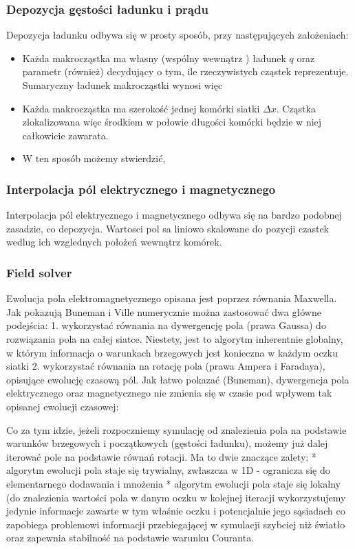 \subsubsection{Depozycja gęstości ładunku i prądu}
Depozycja ładunku odbywa się w prosty sposób, przy następujących założeniach:
\begin{itemize}
    \item Każda makrocząstka ma własny (wspólny wewnątrz ) ładunek $q$ oraz parametr  (również) %
    decydujący o tym, ile rzeczywistych cząstek reprezentuje. Sumaryczny ładunek makrocząstki wynosi więc 
    \item Każda makrocząstka ma szerokość jednej komórki siatki $\Delta x$. Cząstka zlokalizowana więc środkiem
    w połowie długości komórki będzie w niej całkowicie zawarata.
    \item W ten sposób możemy stwierdzić, %


\end{itemize}
\subsubsection{Interpolacja pól elektrycznego i magnetycznego}
Interpolacja pól elektrycznego i magnetycznego odbywa się na bardzo podobnej zasadzie, co depozycja.
Wartosci pol sa liniowo skalowane do pozycji czastek wedlug ich wzglednych położeń wewnątrz komórek.
\subsubsection{Field solver} %

Ewolucja pola elektromagnetycznego opisana jest poprzez równania Maxwella. Jak pokazują Buneman i Ville %
numerycznie można zastosować dwa główne podejścia: %
1. wykorzystać równania na dywergencję pola (prawa Gaussa) do rozwiązania pola na całej siatce. Niestety, jest to
algorytm inherentnie globalny, w którym informacja o warunkach brzegowych jest konieczna w każdym oczku siatki
2. wykorzystać równania na rotację pola (prawa Ampera i Faradaya), opisujące ewolucję czasową pól. Jak łatwo pokazać (Buneman),
dywergencja pola elektrycznego oraz magnetycznego nie zmienia się w czasie pod wpływem tak opisanej ewolucji czasowej:

Co za tym idzie, jeżeli rozpoczniemy symulację od znalezienia pola na podstawie warunków brzegowych i początkowych (gęstości
ładunku), możemy już dalej iterować pole na podstawie równań rotacji. Ma to dwie znaczące zalety:
* algorytm ewolucji pola staje się trywialny, zwłaszcza w 1D - ogranicza się do elementarnego dodawania i mnożenia %
* algorytm ewolucji pola staje się lokalny (do znalezienia wartości pola w danym oczku w kolejnej iteracji wykorzystujemy
jedynie informacje zawarte w tym właśnie oczku i potencjalnie jego sąsiadach %
co zapobiega problemowi informacji przebiegającej w symulacji szybciej niż światło oraz zapewnia stabilność na podstawie
warunku Couranta.

